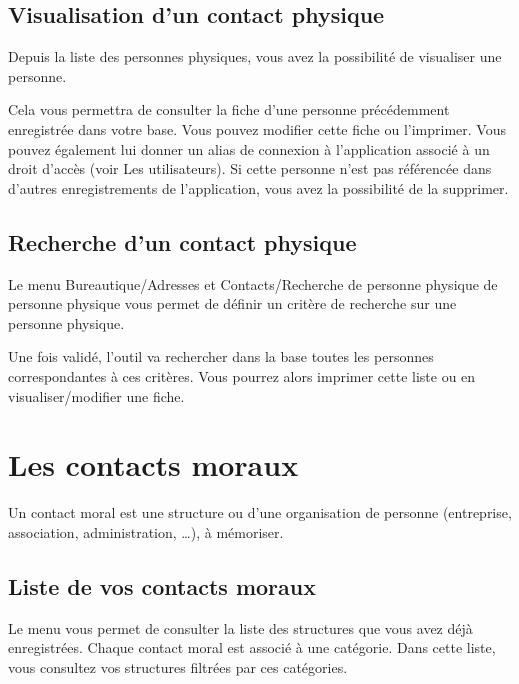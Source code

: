 \documentclass[letterpaper,10pt,french]{sphinxmanual}
\begin{document}
\noindent{}


\subsection{Visualisation d’un contact physique}
\label{\detokenize{contacts/individual:visualisation-d-un-contact-physique}}
Depuis la liste des personnes physiques, vous avez la possibilité de visualiser une personne.

Cela vous permettra de consulter la fiche d’une personne précédemment enregistrée dans votre base. Vous pouvez modifier cette fiche ou l’imprimer. Vous pouvez également lui donner un alias de connexion à l’application associé à un droit d’accès (voir Les utilisateurs). Si cette personne n’est pas référencée dans d’autres enregistrements de l’application, vous avez la possibilité de la supprimer.

\noindent{}


\subsection{Recherche d’un contact physique}
\label{\detokenize{contacts/individual:recherche-d-un-contact-physique}}
Le menu Bureautique/Adresses et Contacts/Recherche de personne physique de personne physique vous permet de définir un critère de recherche sur une personne physique.

Une fois validé, l’outil va rechercher dans la base toutes les personnes correspondantes à ces critères. Vous pourrez alors imprimer cette liste ou en visualiser/modifier une fiche.

\noindent{}


\section{Les contacts moraux}
\label{\detokenize{contacts/legal_entity:les-contacts-moraux}}\label{\detokenize{contacts/legal_entity::doc}}
Un contact moral est une structure ou d’une organisation de personne (entreprise, association, administration, …), à mémoriser.


\subsection{Liste de vos contacts moraux}
\label{\detokenize{contacts/legal_entity:liste-de-vos-contacts-moraux}}
Le menu  vous permet de consulter la liste des structures que vous avez déjà enregistrées. Chaque contact moral est associé à une catégorie. Dans cette liste, vous consultez vos structures filtrées par ces catégories.
\end{document}
